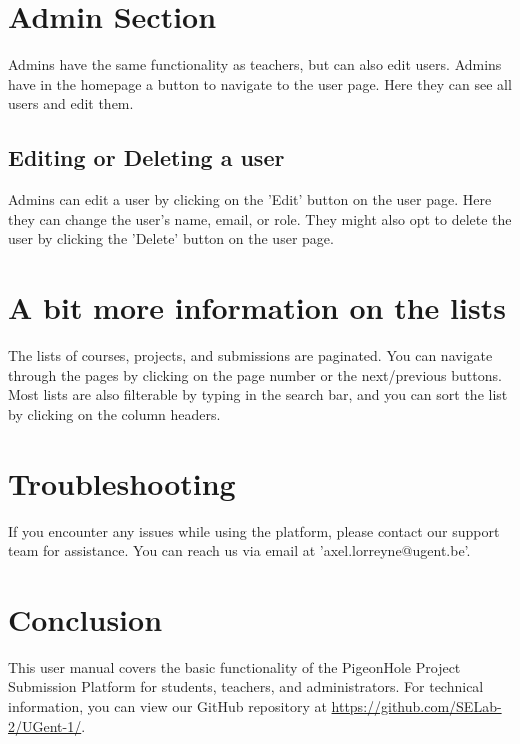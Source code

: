 \documentclass{article}
\begin{document}
\section{Admin Section}

Admins have the same functionality as teachers, but can also edit users. Admins have in the homepage a button to navigate to the user page. Here they can see all users and edit them.

\subsection{Editing or Deleting a user}
Admins can edit a user by clicking on the 'Edit' button on the user page. Here they can change the user's name, email, or role. They might also opt to delete the user by clicking the 'Delete' button on the user page.

\section{A bit more information on the lists}
The lists of courses, projects, and submissions are paginated. You can navigate through the pages by clicking on the page number or the next/previous buttons.
Most lists are also filterable by typing in the search bar, and you can sort the list by clicking on the column headers.

\section{Troubleshooting}
If you encounter any issues while using the platform, please contact our support team for assistance. You can reach us via email at 'axel.lorreyne@ugent.be'.

\section{Conclusion}
This user manual covers the basic functionality of the PigeonHole Project Submission Platform for students, teachers, and administrators. For technical information, you can view our GitHub repository at \url{https://github.com/SELab-2/UGent-1/}.
\end{document}
